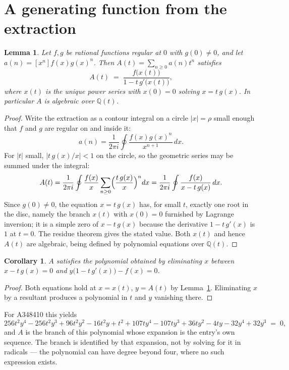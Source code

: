 \documentclass[11pt,a4paper]{article}
\theoremstyle{plain}
\newtheorem{lemma}[theorem]{Lemma}
\newtheorem{corollary}[theorem]{Corollary}
\theoremstyle{definition}
\begin{document}
\section{A generating function from the extraction}

\begin{lemma}\label{lem:diag}
Let $f,g$ be rational functions regular at $0$ with $g(0)\neq0$, and let
$a(n)=[x^{n}]f(x)g(x)^{n}$. Then $A(t)=\sum_{n\ge0}a(n)t^{n}$ satisfies
\[
A(t)\;=\;\frac{f\bigl(x(t)\bigr)}{1-t\,g'\bigl(x(t)\bigr)},
\]
where $x(t)$ is the unique power series with $x(0)=0$ solving $x=t\,g(x)$. In particular
$A$ is algebraic over $\mathbb{Q}(t)$.
\end{lemma}

\begin{proof}
Write the extraction as a contour integral on a circle $|x|=\rho$ small enough that $f$
and $g$ are regular on and inside it:
\[
a(n)=\frac{1}{2\pi i}\oint \frac{f(x)g(x)^{n}}{x^{n+1}}\,dx .
\]
For $|t|$ small, $|t\,g(x)/x|<1$ on the circle, so the geometric series may be summed
under the integral:
\[
A(t)=\frac{1}{2\pi i}\oint\frac{f(x)}{x}\sum_{n\ge0}\Bigl(\frac{t\,g(x)}{x}\Bigr)^{n}dx
     =\frac{1}{2\pi i}\oint\frac{f(x)}{x-t\,g(x)}\,dx .
\]
Since $g(0)\neq0$, the equation $x=t\,g(x)$ has, for small $t$, exactly one root in the
disc, namely the branch $x(t)$ with $x(0)=0$ furnished by Lagrange inversion; it is a
simple zero of $x-t\,g(x)$ because the derivative $1-t\,g'(x)$ is $1$ at $t=0$. The
residue theorem gives the stated value. Both $x(t)$ and hence $A(t)$ are algebraic,
being defined by polynomial equations over $\mathbb{Q}(t)$.
\end{proof}

\begin{corollary}\label{cor:minpoly}
$A$ satisfies the polynomial obtained by eliminating $x$ between
$x-t\,g(x)=0$ and $y\bigl(1-t\,g'(x)\bigr)-f(x)=0$.
\end{corollary}

\begin{proof}
Both equations hold at $x=x(t)$, $y=A(t)$ by Lemma~\ref{lem:diag}. Eliminating $x$ by a
resultant produces a polynomial in $t$ and $y$ vanishing there.
\end{proof}

For A348410 this yields
\[
256 t^{2} y^{4} - 256 t^{2} y^{3} + 96 t^{2} y^{2} - 16 t^{2} y + t^{2} + 107 t y^{4} - 107 t y^{3} + 36 t y^{2} - 4 t y - 32 y^{4} + 32 y^{3} \;=\;0 ,
\]
and $A$ is the branch of this polynomial whose expansion is the entry's own sequence.
The branch is identified by that expansion, not by solving for it in radicals --- the
polynomial can have degree beyond four, where no such expression exists.
\end{document}
